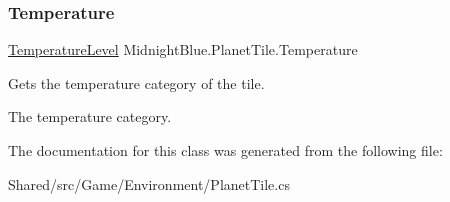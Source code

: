 \subsubsection{\texorpdfstring{Temperature}{Temperature}}
{\footnotesize\ttfamily \hyperlink{namespace_midnight_blue_a6ea6484178cbe707f25d1a0ed56db7ab}{Temperature\+Level} Midnight\+Blue.\+Planet\+Tile.\+Temperature\hspace{0.3cm}{\ttfamily [get]}}



Gets the temperature category of the tile. 

The temperature category.

The documentation for this class was generated from the following file\+:\begin{DoxyCompactItemize}
\item 
Shared/src/\+Game/\+Environment/Planet\+Tile.\+cs\end{DoxyCompactItemize}
